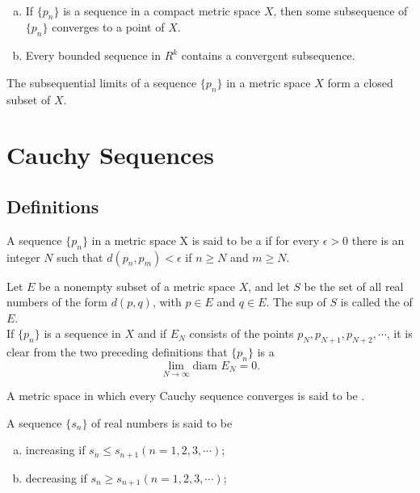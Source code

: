\begin{theorem}
	~
	\begin{enumerate}[(a)]
		\item If $\{p_n\}$ is a sequence in a compact metric space $X$, then some subsequence of $\{p_n\}$ converges to a point of $X$.
		\item Every bounded sequence in $R^k$ contains a convergent subsequence.
	\end{enumerate}
\end{theorem}

\begin{theorem}
	The subsequential limits of a sequence $\{p_n\}$ in a metric space $X$ form a closed subset of $X$.
\end{theorem}

\section{Cauchy Sequences}
\subsection{Definitions}
\begin{definition}
	A sequence $\{p_n\}$ in a metric space X is said to be a {} if for every $\epsilon>0$ there is an integer $N$ such that $d(p_n,p_m)<\epsilon$ if $n\geq N$ and $m\geq N$.
\end{definition}

\begin{definition}
	Let $E$ be a nonempty subset of a metric space $X$, and let $S$ be the set of all real numbers of the form $d(p,q)$, with $p\in E$ and $q\in E$. The sup of $S$ is called the {} of $E$.\\
	If $\{p_n\}$ is a sequence in $X$ and if $E_N$ consists of the points $p_N, p_{N+1}, p_{N+2}, \cdots$, it is clear from the two preceding definitions that $\{p_n\}$ is a {} $$\lim_{N \to \infty} \text{diam }E_N =0.$$
\end{definition}

\begin{definition}
	A metric space in which every Cauchy sequence converges is said to be {}. 
\end{definition}

\begin{definition}
	A sequence $\{s_n\}$ of real numbers is said to be
	\begin{enumerate}[(a)]
		\item {} increasing if $s_n \leq s_{n+1} (n=1,2,3,\cdots)$;
		\item {} decreasing if $s_n \geq s_{n+1} (n=1,2,3,\cdots)$;
	\end{enumerate}
\end{definition}

